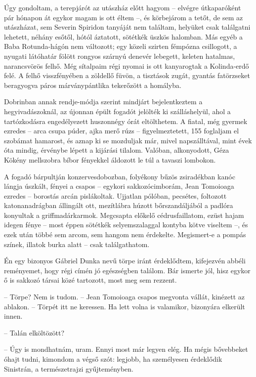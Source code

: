 \documentclass{IEEEtran}
\begin{document}
Úgy gondoltam, a terepjárót az utászház előtt hagyom – elvégre útkaparóként
pár hónapon át egykor magam is ott éltem –, és körbejárom a tetőt, de sem az
utászházat, sem Severin Spiridon tanyáját nem találtam, helyüket csak
találgatni lehetett, néhány esőtől, hótól áztatott, sötétkék üszkös halomban.
Más egyéb a Baba Rotunda-hágón nem változott; egy közeli szirten fémpózna
csillogott, a nyugati látóhatár fölött rongyos szárnyú denevér lebegett,
keleten hatalmas, narancsvörös felhő. Még sítalpaim régi nyomai is ott
kanyarogtak a Kolinda-erdő felé. A felhő visszfényében a zöldellő füvön, a
tisztások zugát, gyantás fatörzseket beragyogva páros márványpántlika
tekerőzött a homályba.

Dobrinban annak rendje-módja szerint mindjárt bejelentkeztem a
hegyivadászoknál, az újonnan épült fogadót jelölték ki szálláshelyül, ahol a
tartózkodásra engedélyezett huszonnégy órát eltölthetem. A fiatal, még gyermek
ezredes – arca csupa púder, ajka merő rúzs – figyelmeztetett, 155 foglaljam el
szobámat hamarost, és aznap ki se mozduljak már, mivel napszálltával, mint
évek óta mindig, érvénybe lépett a kijárási tilalom. Valóban, alkonyodott,
Géza Kökény mellszobra bíbor fényekkel áldozott le túl a tavaszi lombokon.

A fogadó bárpultján konzervesdobozban, folyékony bűzös zsiradékban kanóc
lángja úszkált, fényei a csapos – egykori sakkozócimborám, Jean Tomoioaga
ezredes – borostás arcán pislákoltak. Ujjatlan pólóban, pecsétes, foltozott
katonanadrágban állingált ott, mezítlábra húzott bőrszandáljából a padlóra
konyultak a griffmadárkarmok. Megcsapta előkelő cédrusfaillatom, ezüst hajam
idegen fénye – most éppen sötétkék selyemszalaggal kontyba kötve viseltem –,
és ezek után többé sem arcom, sem hangom nem érdekelte. Megismert-e a pompás
színek, illatok burka alatt – csak találgathatom.

Én egy bizonyos Gábriel Dunka nevű törpe iránt érdeklődtem, kifejezvén abbéli
reményemet, hogy régi címén jó egészségben találom. Bár ismerte jól, hisz
egykor ő is sakkozó társai közé tartozott, most meg sem rezzent.

– Törpe? Nem is tudom. – Jean Tomoioaga csapos megvonta vállát, kinézett az
ablakon. – Törpét itt ne keressen. Ha lett volna is valamikor, bizonyára
elkerült innen.

– Talán elköltözött?

– Úgy is mondhatnám, uram. Ennyi most már legyen elég. Ha mégis bővebbeket
óhajt tudni, kimondom a végső szót: legjobb, ha személyesen érdeklődik
Sinistrán, a természetrajzi gyűjteményben.
\end{document}
